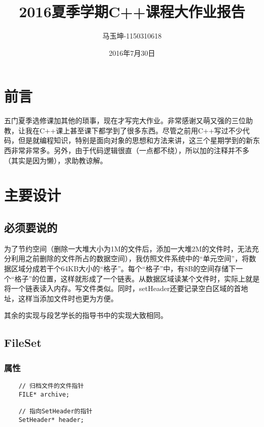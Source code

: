 \documentclass[11pt, a4paper]{article}
\begin{document}
\begin{CJK*}{UTF8}{gbsn}
  \title{\bf 2016夏季学期C++课程大作业报告}
  \author{马玉坤-1150310618}
  \date{2016年7月30日}
  \maketitle
  \renewcommand{\contentsname}{\textbf{目录}}
  \tableofcontents
  \newpage
  \newpage

  \section{前言}

  五门夏季选修课加其他的琐事，现在才写完大作业。非常感谢又萌又强的三位助教，让我在C++课上甚至课下都学到了很多东西。尽管之前用C++写过不少代码，但是就编程知识，特别是面向对象的思想和方法来讲，这三个星期学到的新东西非常非常多。另外，由于代码逻辑很直（一点都不绕），所以加的注释并不多（其实是因为懒），求助教谅解。


  \section{主要设计}

  \subsection{必须要说的}

  为了节约空间（删除一大堆大小为1M的文件后，添加一大堆2M的文件时，无法充分利用之前删除的文件所占的数据空间），我仿照文件系统中的“单元空间”，将数据区域分成若干个64KB大小的“格子”。每个“格子”中，有8B的空间存储下一个“格子”的位置，这样就形成了一个链表。从数据区域读某个文件时，实际上就是将一个链表读入内存。写文件类似。同时，setHeader还要记录空白区域的首地址，这样当添加文件时也更为方便。

  其余的实现与段艺学长的指导书中的实现大致相同。


  \subsection{FileSet}
  
  \subsubsection{属性}
  
  \begin{lstlisting}
    // 归档文件的文件指针
    FILE* archive;

    // 指向SetHeader的指针
    SetHeader* header;


\end{lstlisting}
\end{CJK*}
\end{document}
